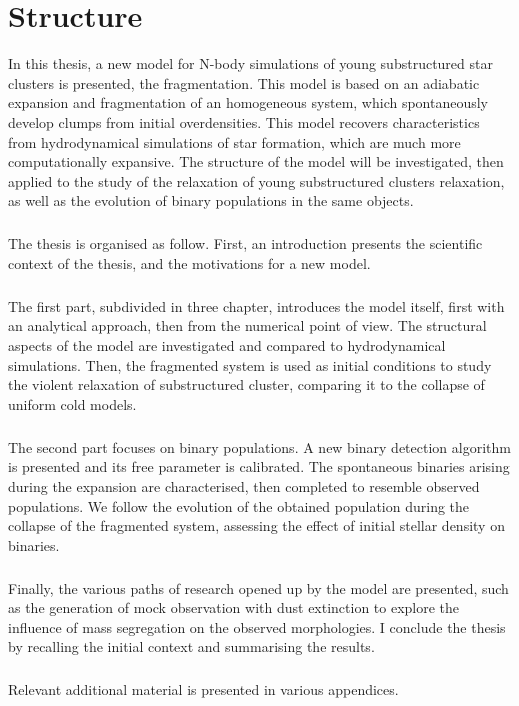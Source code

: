 
\chapter*{Structure}

In this thesis, a new model for N-body simulations of young substructured star clusters is presented, the \HubLem fragmentation. This model is based on an adiabatic expansion and fragmentation of an homogeneous system, which spontaneously develop clumps from initial overdensities. This model recovers characteristics from hydrodynamical simulations of star formation, which are much more computationally expansive. The structure of the \HubLem model will be investigated, then applied to the study of the relaxation of young substructured clusters relaxation, as well as the evolution of binary populations in the same objects. 

\paragraph*{}
The thesis is organised as follow. First, an introduction presents the scientific context of the thesis, and the motivations for a new model. 

\paragraph*{}
The first part, subdivided in three chapter, introduces the \HubLem model itself, first with an analytical approach, then from the numerical point of view. The structural aspects of the model are investigated and compared to hydrodynamical simulations. Then, the fragmented system is used as initial conditions to study the violent relaxation of substructured cluster, comparing it to the collapse of uniform cold models.

\paragraph*{}
The second part focuses on binary populations. A new binary detection algorithm is presented and its free parameter is calibrated. The spontaneous binaries arising during the \HubLem expansion are characterised, then completed to resemble observed populations. We follow the evolution of the obtained population during the collapse of the fragmented system, assessing the effect of initial stellar density on binaries.

\paragraph*{}
Finally,  the various paths of research opened up by the \HubLem model are presented, such as the generation of mock observation with dust extinction to explore the influence of mass segregation on the observed morphologies. I conclude the thesis by recalling the initial context and summarising the results.

\paragraph*{}
Relevant additional material is presented in various appendices. 